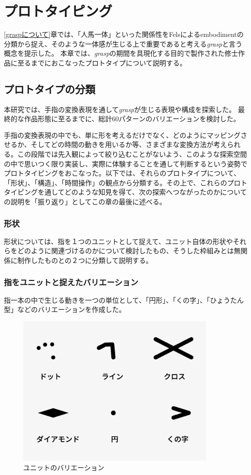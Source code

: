 \chapter{プロトタイピング}
\label{prototyping}
\ref{graspについて}章では、「人馬一体」といった関係性をFelsによるembodimentの分類から捉え、そのような一体感が生じる上で重要であると考える\textit{grasp}と言う概念を提示した。
本章では、\textit{grasp}の期間を具現化する目的で製作された修士作品に至るまでにおこなったプロトタイプについて説明する。

\section{プロトタイプの分類}
本研究では、手指の変換表現を通して\textit{grasp}が生じる表現や構成を探索した。
最終的な作品形態に至るまでに、総計60パターンのバリエーションを検討した。

手指の変換表現の中でも、単に形を考えるだけでなく、どのようにマッピングさせるか、そしてどの時間の動きを用いるか等、さまざまな変換方法が考えられる。この段階では先入観によって絞り込むことがないよう、このような探索空間の中で思いつく限り実装し、実際に体験することを通して判断するという姿勢でプロトタイピングをおこなった。以下では、それらのプロトタイプについて、「形状」、「構造」、「時間操作」の観点から分類する。その上で、これらのプロトタイピングを通してどのような知見を得て、次の探索へつながったのかについての説明を「振り返り」としてこの章の最後に述べる。

\subsection{形状}
形状については、指を１つのユニットとして捉えて、ユニット自体の形状やそれらをどのように関連づけるのかについて検討したもの、そうした枠組みとは無関係に制作したものとの２つに分類して説明する。
\subsection*{指をユニットと捉えたバリエーション}
指一本の中で生じる動きを一つの単位として、「円形」、「くの字」、「ひょうたん型」などのバリエーションを作成した。
\begin{figure}[H]
  \centering
  \includegraphics[width=10cm]{img/unit_valiation.png}
  \caption{ユニットのバリエーション}
  \label{fig:unit_valiation}
\end{figure}

